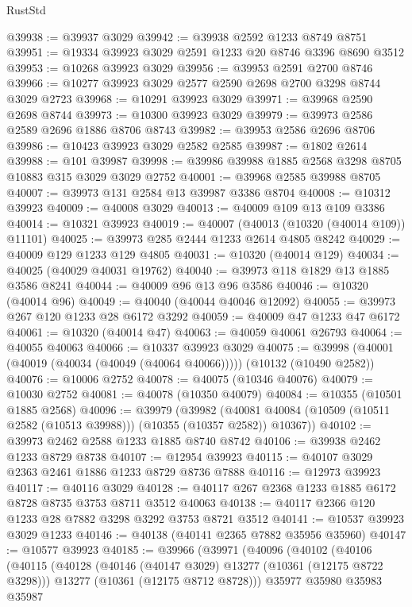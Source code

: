 \begin{lexlean}{RustStd}
\begin{coremodule}
@39938 := @39937 @3029
@39942 := @39938 @2592 @1233 @8749 @8751
@39951 := @19334 @39923 @3029 @2591 @1233 @20 @8746 @3396 @8690 @3512
@39953 := @10268 @39923 @3029
@39956 := @39953 @2591 @2700 @8746
@39966 := @10277 @39923 @3029 @2577 @2590 @2698 @2700 @3298 @8744 @3029 @2723
@39968 := @10291 @39923 @3029
@39971 := @39968 @2590 @2698 @8744
@39973 := @10300 @39923 @3029
@39979 := @39973 @2586 @2589 @2696 @1886 @8706 @8743
@39982 := @39953 @2586 @2696 @8706
@39986 := @10423 @39923 @3029 @2582 @2585
@39987 := @1802 @2614
@39988 := @101 @39987
@39998 := @39986 @39988 @1885 @2568 @3298 @8705 @10883 @315 @3029 @3029 @2752
@40001 := @39968 @2585 @39988 @8705
@40007 := @39973 @131 @2584 @13 @39987 @3386 @8704
@40008 := @10312 @39923
@40009 := @40008 @3029
@40013 := @40009 @109 @13 @109 @3386
@40014 := @10321 @39923
@40019 := @40007 (@40013 (@10320 (@40014 @109)) @11101)
@40025 := @39973 @285 @2444 @1233 @2614 @4805 @8242
@40029 := @40009 @129 @1233 @129 @4805
@40031 := @10320 (@40014 @129)
@40034 := @40025 (@40029 @40031 @19762)
@40040 := @39973 @118 @1829 @13 @1885 @3586 @8241
@40044 := @40009 @96 @13 @96 @3586
@40046 := @10320 (@40014 @96)
@40049 := @40040 (@40044 @40046 @12092)
@40055 := @39973 @267 @120 @1233 @28 @6172 @3292
@40059 := @40009 @47 @1233 @47 @6172
@40061 := @10320 (@40014 @47)
@40063 := @40059 @40061 @26793
@40064 := @40055 @40063
@40066 := @10337 @39923 @3029
@40075 := @39998 (@40001 (@40019 (@40034 (@40049 (@40064 @40066))))) (@10132 (@10490 @2582))
@40076 := @10006 @2752
@40078 := @40075 (@10346 @40076)
@40079 := @10030 @2752
@40081 := @40078 (@10350 @40079)
@40084 := @10355 (@10501 @1885 @2568)
@40096 := @39979
    (@39982 (@40081 @40084 (@10509 (@10511 @2582 (@10513 @39988))) (@10355 (@10357 @2582)) @10367))
@40102 := @39973 @2462 @2588 @1233 @1885 @8740 @8742
@40106 := @39938 @2462 @1233 @8729 @8738
@40107 := @12954 @39923
@40115 := @40107 @3029 @2363 @2461 @1886 @1233 @8729 @8736 @7888
@40116 := @12973 @39923
@40117 := @40116 @3029
@40128 := @40117 @267 @2368 @1233 @1885 @6172 @8728 @8735 @3753 @8711 @3512 @40063
@40138 := @40117 @2366 @120 @1233 @28 @7882 @3298 @3292 @3753 @8721 @3512
@40141 := @10537 @39923 @3029 @1233
@40146 := @40138 (@40141 @2365 @7882 @35956 @35960)
@40147 := @10577 @39923
@40185 := @39966
    (@39971
      (@40096
        (@40102
          (@40106
            (@40115
              (@40128
                (@40146 (@40147 @3029) @13277 (@10361 (@12175 @8722 @3298)))
                @13277
                (@10361 (@12175 @8712 @8728)))
              @35977
              @35980
              @35983
              @35987

\end{coremodule}
\end{lexlean}
